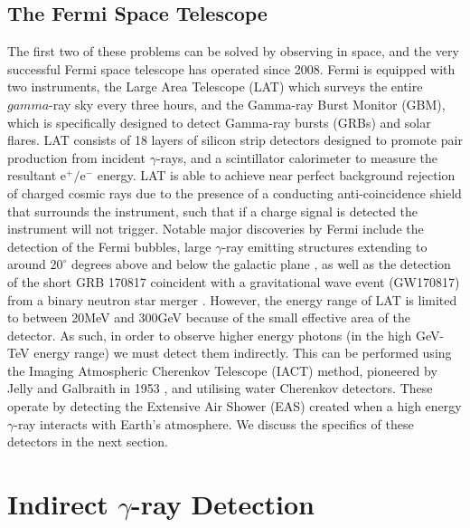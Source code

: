 \subsection{The Fermi Space Telescope}
The first two of these problems can be solved by observing in space, and the very successful Fermi space telescope has operated since 2008. Fermi is equipped with two instruments, the Large Area Telescope (LAT) which surveys the entire $gamma$-ray sky every three hours, and the Gamma-ray Burst Monitor (GBM), which is specifically designed to detect Gamma-ray bursts (GRBs) and solar flares. LAT consists of 18 layers of silicon strip detectors designed to promote pair production from incident $\gamma$-rays, and a scintillator calorimeter to measure the resultant $\mathrm{e^+/e^-}$ energy. LAT is able to achieve near perfect background rejection of charged cosmic rays due to the presence of a conducting anti-coincidence shield that surrounds the instrument, such that if a charge signal is detected the instrument will not trigger. Notable major discoveries by Fermi include the detection of the Fermi bubbles, large $\gamma$-ray emitting structures extending to around $\mathrm{20^{\circ}}$ degrees above and below the galactic plane \cite{hooperslayter}, as well as the detection of the short GRB 170817 coincident with a gravitational wave event (GW170817) from a binary neutron star merger \cite{ligogrb}. However, the energy range of LAT is limited to between 20MeV and 300GeV because of the small effective area of the detector. As such, in order to observe higher energy photons (in the high GeV-TeV energy range) we must detect them indirectly. This can be performed using the Imaging Atmospheric Cherenkov Telescope  (IACT) method, pioneered by Jelly and Galbraith in 1953 \cite{G+J}, and utilising water Cherenkov detectors. These operate by detecting the Extensive Air Shower (EAS) created when a high energy $\gamma$-ray interacts with Earth's atmosphere. We discuss the specifics of these detectors in the next section. 

\section{Indirect \ensuremath{\gamma}-ray Detection}
